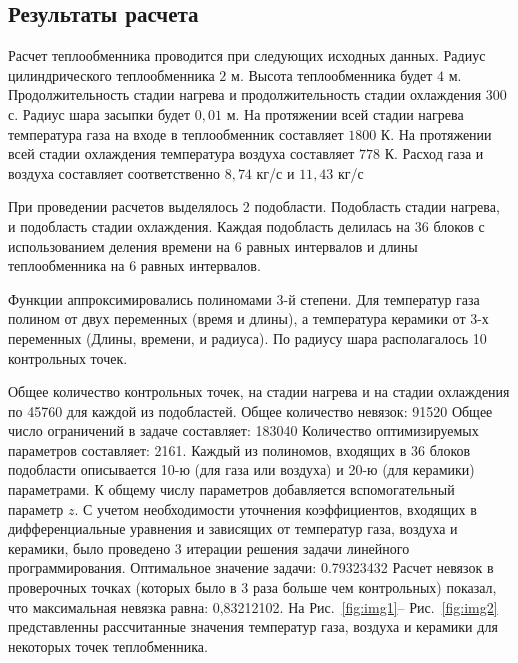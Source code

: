\documentclass[a4paper,11pt,numreferences,mathsec,kaplist]{isuepsutf8}
\begin{document}
\begin{article}
\section{Результаты расчета}

Расчет теплообменника проводится при следующих исходных данных. Радиус
цилиндрического теплообменника $2$ м. Высота теплообменника будет $4$ м.
Продолжительность стадии нагрева и продолжительность стадии охлаждения
$300$ с. Радиус шара засыпки будет $0,01$ м. На протяжении всей стадии
нагрева температура газа на входе в теплообменник составляет $1800$ К.
На протяжении всей стадии охлаждения температура воздуха составляет
$778$ К. Расход газа и воздуха составляет соответственно $8,74$ кг/с и
$11,43$ кг/с

При проведении расчетов выделялось 2 подобласти. Подобласть стадии
нагрева, и подобласть стадии охлаждения. Каждая подобласть делилась на
36 блоков с использованием деления времени на 6 равных интервалов и
длины теплообменника на 6 равных интервалов.

Функции аппроксимировались полиномами 3-й степени. Для температур газа
полином от двух переменных (время и длины), а температура керамики от
3-х переменных (Длины, времени, и радиуса). По радиусу шара
располагалось 10 контрольных точек.

Общее количество контрольных точек, на стадии нагрева и на стадии
охлаждения по 45760 для каждой из подобластей. Общее количество
невязок: 91520 Общее число ограничений в задаче составляет: 183040
Количество оптимизируемых параметров составляет: 2161. Каждый из
полиномов, входящих в 36 блоков подобласти описывается 10-ю (для газа
или воздуха) и 20-ю (для керамики) параметрами. К общему числу
параметров добавляется вспомогательный параметр $z$. С учетом
необходимости уточнения коэффициентов, входящих в дифференциальные
уравнения и зависящих от температур газа, воздуха и керамики, было
проведено 3 итерации решения задачи линейного программирования.
Оптимальное значение задачи: 0.79323432 Расчет невязок в проверочных
точках (которых было в 3 раза больше чем контрольных) показал, что
максимальная невязка равна: 0,83212102. На Рис.~\ref{fig:img1}--
Рис.~\ref{fig:img2} представленны рассчитанные значения температур газа,
воздуха и керамики для некоторых точек теплобменника.


\end{article}
\end{document}
